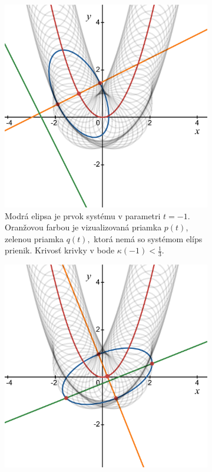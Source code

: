 \begin{figure}[h]
    \centering
    \begin{subfigure}[b]{0.49\textwidth}
        \centering
        \includegraphics[width=\textwidth]{images/axis_t=-1.pdf}
	\caption{Modrá elipsa je prvok systému v parametri $t=-1.$ Oranžovou farbou je vizualizovaná priamka $p(t)$, zelenou priamka $q(t),$ ktorá nemá so systémom elíps prienik. Krivosť krivky v bode $\kappa(-1) < \frac{1}{3}.$}
        \label{fig:parabola_1}
    \end{subfigure}
    \hfill
    \begin{subfigure}[b]{0.49\textwidth}
        \centering
        \includegraphics[width=\textwidth]{images/axis_t=0.2.pdf}

\end{subfigure}
\end{figure}
